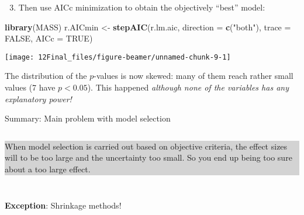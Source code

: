 \documentclass[10pt,ignorenonframetext,]{beamer}
\newenvironment{Shaded}{\begin{snugshade}}{\end{snugshade}}
\newcommand{\DataTypeTok}[1]{\textcolor[rgb]{0.13,0.29,0.53}{#1}}
\newcommand{\DecValTok}[1]{\textcolor[rgb]{0.00,0.00,0.81}{#1}}
\newcommand{\KeywordTok}[1]{\textcolor[rgb]{0.13,0.29,0.53}{\textbf{#1}}}
\newcommand{\NormalTok}[1]{#1}
\newcommand{\OperatorTok}[1]{\textcolor[rgb]{0.81,0.36,0.00}{\textbf{#1}}}
\newcommand{\OtherTok}[1]{\textcolor[rgb]{0.56,0.35,0.01}{#1}}
\newcommand{\StringTok}[1]{\textcolor[rgb]{0.31,0.60,0.02}{#1}}
\providecommand{\tightlist}{%
  \setlength{\itemsep}{0pt}\setlength{\parskip}{0pt}}
\begin{document}
\begin{frame}[fragile]

\begin{enumerate}
\setcounter{enumi}{2}
\tightlist
\item
  Then use AICc minimization to obtain the objectively ``best'' model:
\end{enumerate}

\vspace{2mm}

\scriptsize

\begin{Shaded}
\begin{Highlighting}[]
\KeywordTok{library}\NormalTok{(MASS)}
\NormalTok{r.AICmin <-}\StringTok{ }\KeywordTok{stepAIC}\NormalTok{(r.lm.aic, }\DataTypeTok{direction =} \KeywordTok{c}\NormalTok{(}\StringTok{"both"}\NormalTok{), }\DataTypeTok{trace =} \OtherTok{FALSE}\NormalTok{, }\DataTypeTok{AICc =} \OtherTok{TRUE}\NormalTok{)}
\end{Highlighting}
\end{Shaded}

\centering

\begin{Shaded}
\end{Shaded}

\texttt{[image: 12Final\_files/figure-beamer/unnamed-chunk-9-1]}

\flushleft
\normalsize

The distribution of the \(p\)-values is now skewed: many of them reach
rather small values (7 have \(p<0.05\)). This happened \emph{although
none of the variables has any explanatory power!}

\end{frame}

\begin{frame}

\begin{block}{Summary: Main problem with model selection}

\(~\)

\colorbox{lightgray}{\begin{minipage}{10cm}
When model selection is carried out based on objective criteria, the effect sizes will to be too large and the uncertainty too small. So you end up being too sure about a too large effect. 
\end{minipage}}

\(~\)

\(~\)

\textbf{Exception}: Shrinkage methods!

\end{block}

\end{frame}
\end{document}
